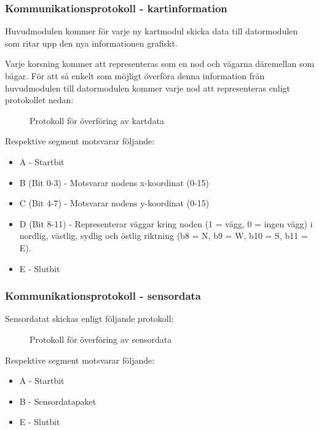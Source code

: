 \documentclass[11pt]{article}
\begin{document}
\begin{flushleft}
\subsubsection{Kommunikationsprotokoll - kartinformation}
Huvudmodulen kommer för varje ny kartmodul skicka data till datormodulen som ritar upp den nya informationen grafiskt. 

Varje korsning kommer att representeras som en nod och vägarna däremellan som bågar. För att så enkelt som möjligt överföra denna information från huvudmodulen till datormodulen kommer varje nod att representeras enligt protokollet nedan:

 \begin{figure}[H]
\centering
\noindent\resizebox{.8\linewidth}{!}{
	}
	\caption{Protokoll för överföring av kartdata \label{kartdata}}	
\end{figure} 

Respektive segment motsvarar följande: 
\begin{itemize}
	\item A - Startbit
	\item B (Bit 0-3) - Motsvarar nodens x-koordinat (0-15)
	\item C (Bit 4-7) - Motsvarar nodens y-koordinat (0-15)
	\item D (Bit 8-11) - Representerar väggar kring noden (1 = vägg, 0 = ingen vägg) i nordlig, västlig, sydlig och östlig riktning (b8 = N, b9 = W, b10 = S, b11 = E).
	\item E - Slutbit
\end{itemize}

\subsubsection{Kommunikationsprotokoll - sensordata}
Sensordatat skickas enligt följande protokoll:

 \begin{figure}[H]
\centering
\noindent\resizebox{.8\linewidth}{!}{
	}
	\caption{Protokoll för överföring av sensordata\label{sensordata}}	
\end{figure} 

Respektive segment motsvarar följande: 
\begin{itemize}
	\item A - Startbit
	\item B - Sensordatapaket
	\item E - Slutbit
\end{itemize}


\end{flushleft}
\end{document}
